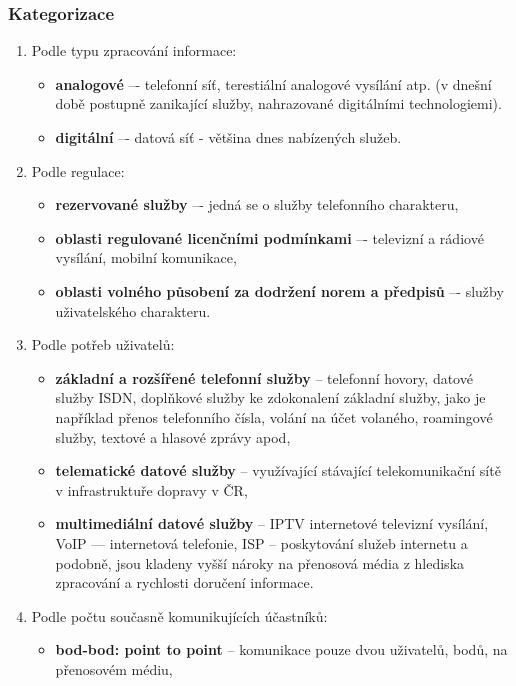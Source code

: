 \subsubsection{Kategorizace}
\begin{enumerate}
    \item Podle typu zpracování informace:
        \begin{itemize}
            \item \textbf{analogové} –- telefonní síť, terestiální analogové vysílání atp. (v dnešní době postupně zanikající služby, nahrazované digitálními technologiemi).
            \item \textbf{digitální} –- datová síť - většina dnes nabízených služeb.
        \end{itemize}
    \item Podle regulace:
        \begin{itemize}
            \item \textbf{rezervované služby} –- jedná se o služby telefonního charakteru,
            \item \textbf{oblasti regulované licenčními podmínkami} –- televizní a rádiové vysílání, mobilní komunikace,
            \item \textbf{oblasti volného působení za dodržení norem a předpisů} –- služby uživatelského charakteru. 
        \end{itemize}
    \item Podle potřeb uživatelů:
    \begin{itemize}
        \item \textbf{základní a rozšířené telefonní služby} – telefonní hovory, datové služby ISDN, doplňkové služby ke zdokonalení základní služby, jako je například přenos telefonního čísla, volání na účet volaného, roamingové služby, textové a hlasové zprávy apod,
        \item \textbf{telematické datové služby} – využívající stávající telekomunikační sítě v infrastruktuře dopravy v ČR,
        \item \textbf{multimediální datové služby} – IPTV internetové televizní vysílání, VoIP –– internetová telefonie, ISP – poskytování služeb internetu a podobně, jsou kladeny vyšší nároky na přenosová média z hlediska zpracování a rychlosti doručení informace.
    \end{itemize}
    \item Podle počtu současně komunikujících účastníků:
    \begin{itemize}
        \item \textbf{bod-bod: point to point} – komunikace pouze dvou uživatelů, bodů, na přenosovém médiu,

\end{itemize}
\end{enumerate}
